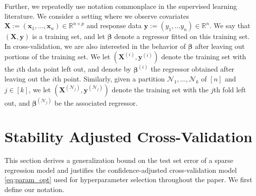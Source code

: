 \documentclass[mnsc,nonblindrev]{informs3} %
\begin{document}

Further, we repeatedly use notation commonplace in the supervised learning literature. We consider a setting where we observe covariates $\bm{X}:=(\bm{x}_1, \ldots, \bm{x}_n) \in \mathbb{R}^{n \times p}$ and response data $\bm{y}:=(y_1, \ldots y_n) \in \mathbb{R}^n$. %
We say that $(\bm{X}, \bm{y})$ is a training set, and let $\bm{\beta}$ denote a regressor fitted on this training set. In cross-validation, we are also interested in the behavior of $\bm{\beta}$ after {\color{black}leaving out portions of} the training set. We let $(\bm{X}^{(i)}, \bm{y}^{(i)})$ denote the training set with the $i$th data point left out, and denote by $\bm{\beta}^{(i)}$ the regressor obtained after leaving out the $i$th point. {\color{black}Similarly, given a partition $\mathcal{N}_1,\dots,\mathcal{N}_k$  of $[n]$ and $j\in [k]$, we let $(\bm{X}^{(\mathcal{N}_j)}, \bm{y}^{(\mathcal{N}_j)})$ denote the training set with the $j$th fold left out, and $\bm{\beta}^{(\mathcal{N}_j)}$ be the associated regressor.} 


\section{Stability Adjusted Cross-Validation}\label{subsec:lowerbounds}

{\color{black}
This section derives a generalization bound on the test set error of a sparse regression model and justifies the confidence-adjusted cross-validation model \eqref{eq:param_opt} used for hyperparameter selection throughout the paper. We first define our notation.}
\end{document}
